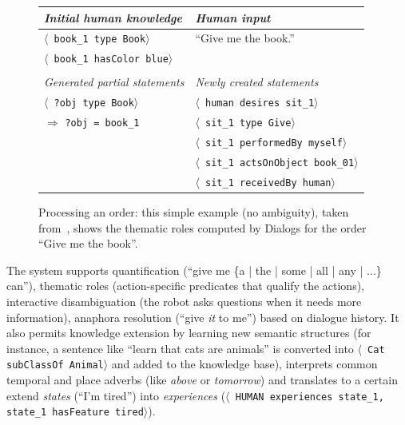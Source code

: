 \documentclass[preprint,3p,times]{elsarticle}
\newcommand{\concept}[1]{{\small \texttt{#1}}}
\newcommand{\stmt}[1]{{\footnotesize \tt $\langle$ #1\relax$\rangle$}}
\begin{document}
\begin{figure}
    \centering
	\begin{tabular}{l|l}
	\emph{Initial human knowledge} &
	\emph{Human input}\\
	
	\hline
	
    	\stmt{book\_1 type Book} &
	``Give me the book.'' \\
	
    	\stmt{book\_1 hasColor blue} & \\
	\vspace{0.5em}\\
	\hline
    	
	\emph{Generated partial statements} &
	\emph{Newly created statements}\\
	\hline
    	\stmt{?obj type Book} & 
	\stmt{human desires sit\_1} \\
	
	\hspace{0.2cm}$\Rightarrow$ \concept{?obj = book\_1}
    	& \stmt{sit\_1 type Give} \\
    	& \stmt{sit\_1 performedBy myself} \\
    	& \stmt{sit\_1 actsOnObject book\_01} \\
    	& \stmt{sit\_1 receivedBy human} \\
	\end{tabular}

    \caption{Processing an order: this simple example (no ambiguity), taken
    from~\cite{Lemaignan2011a}, shows the thematic roles computed by 
    {\sc Dialogs} for the order ``Give me the book''.}

    \label{dialogs|ex}
\end{figure}


The system supports quantification (``give me \{a | the | some | all | any |
...\} can''), thematic roles (action-specific predicates that qualify the
actions), interactive disambiguation (the robot asks questions when it needs
more information), anaphora resolution (``give \emph{it} to me'') based on
dialogue history. It also permits knowledge extension by learning new semantic
structures (for instance, a sentence like ``learn that cats are animals'' is
converted into \stmt{Cat subClassOf Animal} and added to the knowledge base),
interprets common temporal and place adverbs (like \emph{above} or
\emph{tomorrow}) and translates to a certain extend \emph{states} (``I'm
tired'') into \emph{experiences} (\stmt{HUMAN experiences state\_1, state\_1
hasFeature tired}).
\end{document}
